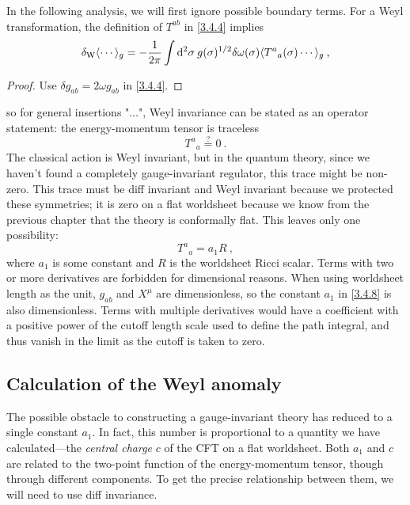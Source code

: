 In the following analysis, we will first ignore possible boundary terms. For a Weyl transformation, the definition of $T^{ab}$ in \eqref{3.4.4} implies    
\begin{equation}\label{3.4.6}
	\delta_{\mathrm{W}}\langle\cdots\rangle_{g}=-\frac{1}{2 \pi} \int \mathrm{d}^{2} \sigma\: g(\sigma)^{1 / 2} \delta \omega(\sigma)\langle T^{a}{}_{a}(\sigma) \cdots\rangle_{g} \:,
\end{equation}
\begin{tcolorbox}
	\begin{proof}
		Use $\delta g_{ab}=2\omega g_{ab}$ in \eqref{3.4.4}.
	\end{proof}
\end{tcolorbox}
so for general insertions "$\dots$", Weyl invariance can be stated as an operator statement: the energy-momentum tensor is traceless    
\begin{equation}
	{T^a}_{a} \stackrel{?}{=} 0 \:. \label{3.4.7}
\end{equation}
The classical action is Weyl invariant, but in the quantum theory, since we haven't found a completely gauge-invariant regulator, this trace might be non-zero. This trace must be diff invariant and Weyl invariant because we protected these symmetries; it is zero on a flat worldsheet because we know from the previous chapter that the theory is conformally flat. This leaves only one possibility:    
\begin{equation}\label{3.4.8}
	T^{a}{}_{a}=a_{1} R \:,
\end{equation}
where $a_1$ is some constant and $R$ is the worldsheet Ricci scalar. Terms with two or more derivatives are forbidden for dimensional reasons. When using worldsheet length as the unit, $g_{ab}$ and $X^\mu$ are dimensionless, so the constant $a_1$ in \eqref{3.4.8} is also dimensionless.    
Terms with multiple derivatives would have a coefficient with a positive power of the cutoff length scale used to define the path integral, and thus vanish in the limit as the cutoff is taken to zero.    

\subsection*{Calculation of the Weyl anomaly}

The possible obstacle to constructing a gauge-invariant theory has reduced to a single constant $a_1$. In fact, this number is proportional to a quantity we have calculated—the \emph{central charge} $c$ of the CFT on a flat worldsheet. Both $a_1$ and $c$ are related to the two-point function of the energy-momentum tensor, though through different components. To get the precise relationship between them, we will need to use diff invariance.    


